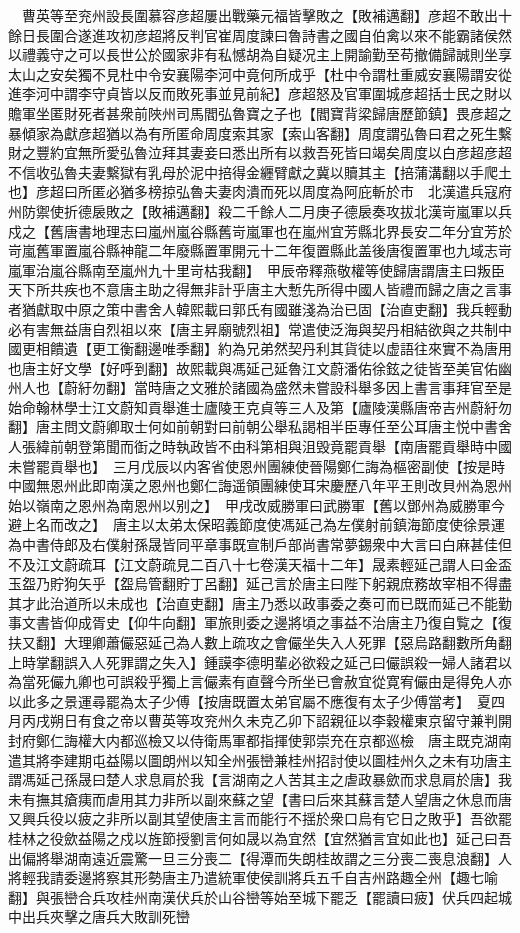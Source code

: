 　曹英等至兖州設長圍慕容彦超屢出戰藥元福皆擊敗之【敗補邁翻】彦超不敢出十餘日長圍合遂進攻初彦超將反判官崔周度諫曰魯詩書之國自伯禽以來不能霸諸侯然以禮義守之可以長世公於國家非有私憾胡為自疑况主上開諭勤至苟撤備歸誠則坐享太山之安矣獨不見杜中令安襄陽李河中竟何所成乎【杜中令謂杜重威安襄陽謂安從進李河中謂李守貞皆以反而敗死事並見前紀】彦超怒及官軍圍城彦超括士民之財以贍軍坐匿財死者甚衆前陜州司馬閻弘魯寶之子也【閻寶背梁歸唐歷節鎮】畏彦超之暴傾家為獻彦超猶以為有所匿命周度索其家【索山客翻】周度謂弘魯曰君之死生繫財之豐約宜無所愛弘魯泣拜其妻妾曰悉出所有以救吾死皆曰竭矣周度以白彦超彦超不信收弘魯夫妻繫獄有乳母於泥中掊得金纒臂獻之冀以贖其主【掊蒲溝翻以手爬土也】彦超曰所匿必猶多榜掠弘魯夫妻肉潰而死以周度為阿庇斬於市　北漢遣兵寇府州防禦使折德扆敗之【敗補邁翻】殺二千餘人二月庚子德扆奏攻拔北漢岢嵐軍以兵戍之【舊唐書地理志曰嵐州嵐谷縣舊岢嵐軍也在嵐州宜芳縣北界長安二年分宜芳於岢嵐舊軍置嵐谷縣神龍二年廢縣置軍開元十二年復置縣此盖後唐復置軍也九域志岢嵐軍治嵐谷縣南至嵐州九十里岢枯我翻】　甲辰帝釋燕敬權等使歸唐謂唐主曰叛臣天下所共疾也不意唐主助之得無非計乎唐主大慙先所得中國人皆禮而歸之唐之言事者猶獻取中原之策中書舍人韓熙載曰郭氏有國雖淺為治已固【治直吏翻】我兵輕動必有害無益唐自烈祖以來【唐主昇廟號烈祖】常遣使泛海與契丹相結欲與之共制中國更相饋遺【更工衡翻邊唯季翻】約為兄弟然契丹利其貨徒以虚語往來實不為唐用也唐主好文學【好呼到翻】故熙載與馮延己延魯江文蔚潘佑徐鉉之徒皆至美官佑幽州人也【蔚紆勿翻】當時唐之文雅於諸國為盛然未嘗設科舉多因上書言事拜官至是始命翰林學士江文蔚知貢舉進士廬陵王克貞等三人及第【廬陵漢縣唐帝吉州蔚紆勿翻】唐主問文蔚卿取士何如前朝對曰前朝公舉私謁相半臣專任至公耳唐主悦中書舍人張緯前朝登第聞而衘之時執政皆不由科第相與沮毁竟罷貢舉【南唐罷貢舉時中國未嘗罷貢舉也】　三月戊辰以内客省使恩州團練使晉陽鄭仁誨為樞密副使【按是時中國無恩州此即南漢之恩州也鄭仁誨遥領團練使耳宋慶歷八年平王則改貝州為恩州始以嶺南之恩州為南恩州以别之】　甲戌改威勝軍曰武勝軍【舊以鄧州為威勝軍今避上名而改之】　唐主以太弟太保昭義節度使馮延己為左僕射前鎮海節度使徐景運為中書侍郎及右僕射孫晟皆同平章事既宣制戶部尚書常夢錫衆中大言曰白麻甚佳但不及江文蔚疏耳【江文蔚疏見二百八十七卷漢天福十二年】晟素輕延己謂人曰金盃玉盌乃貯狗矢乎【盌烏管翻貯丁呂翻】延己言於唐主曰陛下躬親庶務故宰相不得盡其才此治道所以未成也【治直吏翻】唐主乃悉以政事委之奏可而已既而延己不能勤事文書皆仰成胥史【仰牛向翻】軍旅則委之邊將頃之事益不治唐主乃復自覧之【復扶又翻】大理卿蕭儼惡延己為人數上疏攻之會儼坐失入人死罪【惡烏路翻數所角翻上時掌翻誤入人死罪謂之失入】鍾謨李德明輩必欲殺之延己曰儼誤殺一婦人諸君以為當死儼九卿也可誤殺乎獨上言儼素有直聲今所坐已會赦宜從寛宥儼由是得免人亦以此多之景運尋罷為太子少傅【按唐既置太弟官屬不應復有太子少傅當考】　夏四月丙戌朔日有食之帝以曹英等攻兖州久未克乙卯下詔親征以李穀權東京留守兼判開封府鄭仁誨權大内都巡檢又以侍衛馬軍都指揮使郭崇充在京都巡檢　唐主既克湖南遣其將李建期屯益陽以圖朗州以知全州張巒兼桂州招討使以圖桂州久之未有功唐主謂馮延己孫晟曰楚人求息肩於我【言湖南之人苦其主之虐政暴歛而求息肩於唐】我未有撫其瘡痍而虐用其力非所以副來蘇之望【書曰后來其蘇言楚人望唐之休息而唐又興兵役以疲之非所以副其望使唐主言而能行不揺於衆口烏有它日之敗乎】吾欲罷桂林之役歛益陽之戍以旌節授劉言何如晟以為宜然【宜然猶言宜如此也】延己曰吾出偏將舉湖南遠近震驚一旦三分喪二【得潭而失朗桂故謂之三分喪二喪息浪翻】人將輕我請委邊將察其形勢唐主乃遣統軍使侯訓將兵五千自吉州路趣全州【趣七喻翻】與張巒合兵攻桂州南漢伏兵於山谷巒等始至城下罷乏【罷讀曰疲】伏兵四起城中出兵夾擊之唐兵大敗訓死巒